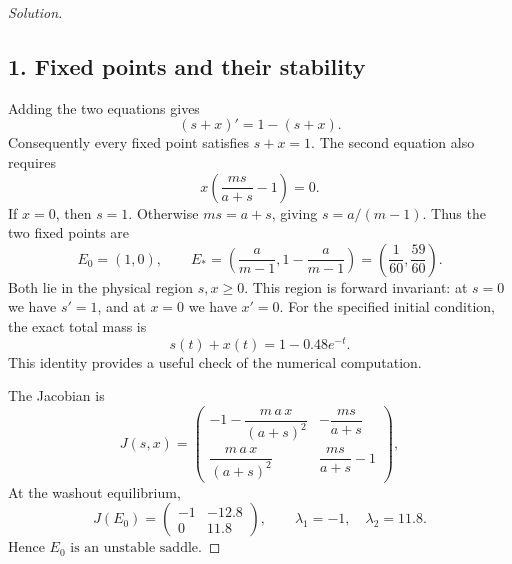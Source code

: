 \documentclass[12pt]{amsart}
\newenvironment{solution}
{\begin{proof}[Solution]}
{\end{proof}}
\begin{document}
\begin{onehalfspace}
        \begin{solution}
            \leavevmode\par
            \subsection*{1. Fixed points and their stability}
            Adding the two equations gives
            \[
                (s+x)'=1-(s+x).
            \]
            Consequently every fixed point satisfies $s+x=1$. The second equation
            also requires
            \[
                x\left(\frac{ms}{a+s}-1\right)=0.
            \]
            If $x=0$, then $s=1$. Otherwise $ms=a+s$, giving $s=a/(m-1)$.
            Thus the two fixed points are
            \[
                \boxed{E_0=(1,0),\qquad E_*=
                    \left(\frac{a}{m-1},1-\frac{a}{m-1}\right)
                    =\left(\frac1{60},\frac{59}{60}\right).}
            \]
            Both lie in the physical region $s,x\ge0$. This region is forward
            invariant: at $s=0$ we have $s'=1$, and at $x=0$ we have $x'=0$.
            For the specified initial condition, the exact total mass is
            \begin{equation}\label{eq:mass}
                \boxed{s(t)+x(t)=1-0.48e^{-t}.}
            \end{equation}
            This identity provides a useful check of the numerical computation.

            The Jacobian is
            \[
                J(s,x)=\begin{pmatrix}
                           -1-\dfrac{m\,a\,x}{(a+s)^2} & -\dfrac{ms}{a+s}\\[6pt]
                           \dfrac{m\,a\,x}{(a+s)^2} & \dfrac{ms}{a+s}-1
                \end{pmatrix},
            \]
            At the washout equilibrium,
            \[
                J(E_0)=\begin{pmatrix}-1&-12.8\\0&11.8\end{pmatrix},
                \qquad \lambda_1=-1,\quad\lambda_2=11.8.
            \]
            Hence $\boxed{E_0\text{ is an unstable saddle.}}$


\end{solution}
\end{onehalfspace}
\end{document}
